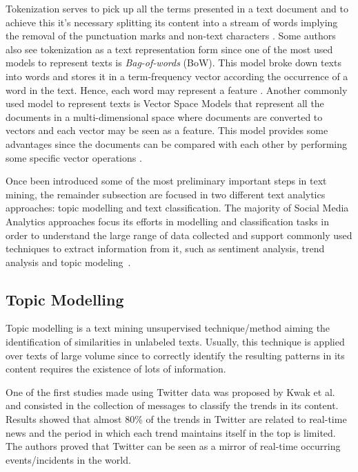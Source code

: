 Tokenization serves to pick up all the terms presented in a text document and to achieve this it's necessary splitting its content into a stream of words implying the removal of the punctuation marks and non-text characters \cite{kn:Hotho2005}. Some authors also see tokenization as a text representation form since one of the most used models to represent texts is \textit{Bag-of-words} (BoW). This model broke down texts into words and stores it in a term-frequency vector according the occurrence of a word in the text. Hence, each word may represent a feature \cite{kn:Sriram2010}. Another commonly used model to represent texts is Vector Space Models that represent all the documents in a multi-dimensional space where documents are converted to vectors and each vector may be seen as a feature. This model provides some advantages since the documents can be compared with each other by performing some specific vector operations \cite{kn:Hotho2005}.

Once been introduced some of the most preliminary important steps in text mining, the remainder subsection are focused in two different text analytics approaches: topic modelling and text classification. The majority of Social Media Analytics approaches focus its efforts in modelling and classification tasks in order to understand the large range of data collected and support commonly used techniques to extract information from it, such as sentiment analysis, trend analysis and topic modeling~\cite{kn:Fan2013}.

\subsection{Topic Modelling}
\label{subsec:topic_modelling_sota}

Topic modelling is a text mining unsupervised technique/method aiming the identification of similarities in unlabeled texts. Usually, this technique is applied over texts of large volume since to correctly identify the resulting patterns in its content requires the existence of lots of information.

One of the first studies made using Twitter data was proposed by Kwak et al.~\cite{kwak2010twitter} and consisted in the collection of messages to classify the trends in its content. Results showed that almost 80\% of the trends in Twitter are related to real-time news and the period in which each trend maintains itself in the top is limited. The authors proved that Twitter can be seen as a mirror of real-time occurring events/incidents in the world.

